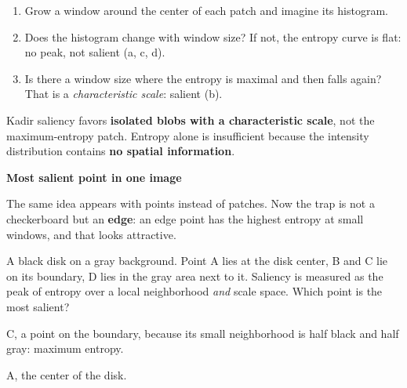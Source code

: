 \documentclass[11pt,a4paper]{article}
\newcommand{\keep}[1]{\par
  \ifdim\dimexpr\pagegoal-\pagetotal\relax<#1\relax\newpage\fi}
\newcommand{\sub}[1]{\keep{6cm}\medskip
  {\sffamily\bfseries\large\color{accent}#1}\par\smallskip}
\begin{document}
\begin{steps}
\begin{enumerate}[leftmargin=*]
  \item Grow a window around the center of each patch and imagine its histogram.
  \item Does the histogram change with window size? If not, the entropy curve is
        flat: no peak, not salient (a, c, d).
  \item Is there a window size where the entropy is maximal and then falls again?
        That is a \emph{characteristic scale}: salient (b).
\end{enumerate}
\end{steps}

\begin{hook}
Kadir saliency favors \textbf{isolated blobs with a characteristic scale}, not
the maximum-entropy patch. Entropy alone is insufficient because the intensity
distribution contains \textbf{no spatial information}.
\end{hook}

\sub{Most salient point in one image}

The same idea appears with points instead of patches. Now the trap is not a
checkerboard but an \textbf{edge}: an edge point has the highest entropy at small
windows, and that looks attractive.

\begin{question}
A black disk on a gray background. Point A lies at the disk center, B and C
lie on its boundary, D lies in the gray area next to it. Saliency is measured as
the peak of entropy over a local neighborhood \emph{and} scale space. Which point
is the most salient?
\end{question}
\begin{yours}
C, a point on the boundary, because its small neighborhood is half black and
half gray: maximum entropy.
\end{yours}
\begin{correct}
A, the center of the disk.
\end{correct}
\end{document}

